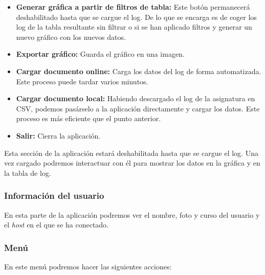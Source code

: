 \begin{itemize}
	\tightlist
	\item
	\textbf{Generar gráfica a partir de filtros de tabla:} Este botón permanecerá deshabilitado hasta que se cargue el log. De lo que se encarga es de coger los log de la tabla resultante sin filtrar o si se han aplicado filtros y generar un nuevo gráfico con los nuevos datos.
	\item
	\textbf{Exportar gráfico:} Guarda el gráfico en una imagen.
	\item
	\textbf{Cargar documento online:} Carga los datos del log de forma automatizada. Este proceso puede tardar varios minutos.
	\item
	\textbf{Cargar documento local:} Habiendo descargado el log de la asignatura en CSV, podemos pasárselo a la aplicación directamente y cargar los datos. Este proceso es más eficiente que el punto anterior.
	\item
	\textbf{Salir:} Cierra la aplicación.
	
	
\end{itemize}


Esta sección de la aplicación estará deshabilitada hasta que se cargue el log. Una vez cargado podremos interactuar con él para mostrar los datos en la gráfica y en la tabla de log.

\subsubsection{Información del usuario}

En esta parte de la aplicación podremos ver el nombre, foto y curso del usuario y el \emph{host} en el que se ha conectado.


\subsubsection{Menú}


En este menú podremos hacer las siguientes acciones:


